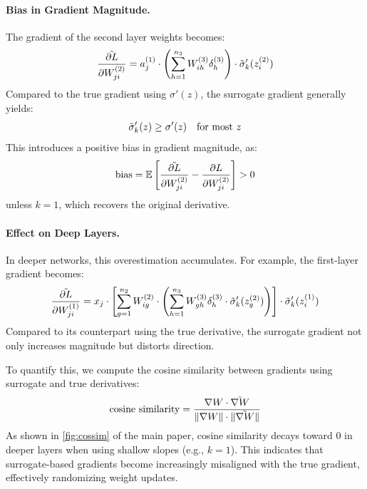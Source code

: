 \paragraph{Bias in Gradient Magnitude.}
The gradient of the second layer weights becomes:
\[
\Tilde{\frac{\partial L}{\partial W^{(2)}_{ji}}} = a_j^{(1)} \cdot \left( \sum_{h=1}^{n_3} W_{ih}^{(3)} \delta_h^{(3)} \right) \cdot \Tilde{\sigma}'_k(z^{(2)}_i)
\]
Compared to the true gradient using \( \sigma'(z) \), the surrogate gradient generally yields:
\[
\Tilde{\sigma}'_k(z) \geq \sigma'(z) \quad \text{for most } z
\]
This introduces a positive bias in gradient magnitude, as:
\[
\text{bias} = \mathbb{E}\left[ \Tilde{\frac{\partial L}{\partial W^{(2)}_{ji}}} - \frac{\partial L}{\partial W^{(2)}_{ji}} \right] > 0
\]
unless \( k = 1 \), which recovers the original derivative.

\paragraph{Effect on Deep Layers.}
In deeper networks, this overestimation accumulates. For example, the first-layer gradient becomes:
\[
\Tilde{\frac{\partial L}{\partial W^{(1)}_{ji}}} = x_j \cdot \left[
\sum_{g=1}^{n_2} W^{(2)}_{ig} \cdot \left( \sum_{h=1}^{n_3} W^{(3)}_{gh} \delta^{(3)}_h \cdot \Tilde{\sigma}'_k(z^{(2)}_g) \right)
\right] \cdot \Tilde{\sigma}'_k(z^{(1)}_i)
\]
Compared to its counterpart using the true derivative, the surrogate gradient not only increases magnitude but distorts direction.

To quantify this, we compute the cosine similarity between gradients using surrogate and true derivatives:
\[
\text{cosine similarity} = \frac{\nabla W \cdot \Tilde{\nabla W}}{\|\nabla W\| \cdot \|\Tilde{\nabla W}\|}
\]
As shown in \autoref{fig:cossim} of the main paper, cosine similarity decays toward 0 in deeper layers when using shallow slopes (e.g., \( k=1 \)). This indicates that surrogate-based gradients become increasingly misaligned with the true gradient, effectively randomizing weight updates.

